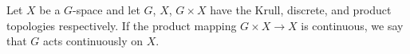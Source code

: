 Let $X$ be a $G$-space and let $G$, $X$, $G \times X$ have the Krull, discrete, and product topologies respectively. If the product mapping $G \times X \to X$ is continuous, we say that $G$ acts continuously on $X$.
